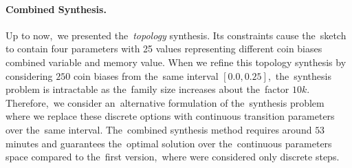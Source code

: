 \paragraph{Combined Synthesis.}
Up to now,~we presented the~\textit{topology} synthesis.
Its constraints cause the~sketch to contain four parameters with 25 values representing different coin biases combined variable and memory value.
When we refine this topology synthesis by considering $250$ coin biases from the~same interval $[0.0, 0.25]$,~the~synthesis problem is intractable as the~family size increases about the~factor $10k$.
Therefore,~we consider an~alternative formulation of the~synthesis problem where we replace these discrete options with continuous transition parameters over the~same interval.
The~combined synthesis method requires around $53$ minutes and guarantees the~optimal solution over the~continuous parameters space compared to the~first version,~where were considered only discrete steps.

